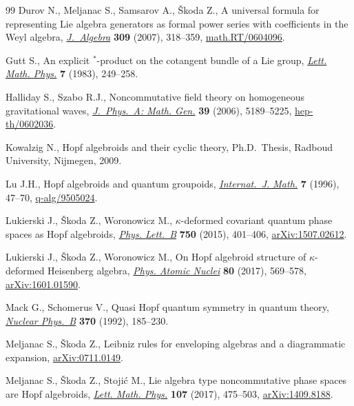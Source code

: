 \documentclass[pdftex]{sigma}
\numberwithin{equation}{section}
\begin{document}
\begin{thebibliography}{99}
Durov N., Meljanac S., Samsarov A., \v{S}koda Z., A universal formula for
 representing {L}ie algebra generators as formal power series with
 coefficients in the {W}eyl algebra, \href{https://doi.org/10.1016/j.jalgebra.2006.08.025}{\textit{J.~Algebra}} \textbf{309} (2007),
 318--359, \href{https://arxiv.org/abs/math.RT/0604096}{math.RT/0604096}.

Gutt S., An explicit {$^{\ast} $}-product on the cotangent bundle of a {L}ie
 group, \href{https://doi.org/10.1007/BF00400441}{\textit{Lett. Math. Phys.}} \textbf{7} (1983), 249--258.

Halliday S., Szabo R.J., Noncommutative field theory on homogeneous
 gravitational waves, \href{https://doi.org/10.1088/0305-4470/39/18/030}{\textit{J.~Phys.~A: Math. Gen.}} \textbf{39} (2006),
 5189--5225, \href{https://arxiv.org/abs/hep-th/0602036}{hep-th/0602036}.

Kowalzig N., Hopf algebroids and their cyclic theory, Ph.D.~Thesis, Radboud
 University, Nijmegen, 2009.

Lu J.H., Hopf algebroids and quantum groupoids, \href{https://doi.org/10.1142/S0129167X96000050}{\textit{Internat.~J. Math.}}
 \textbf{7} (1996), 47--70, \href{https://arxiv.org/abs/q-alg/9505024}{q-alg/9505024}.

Lukierski J., \v{S}koda Z., Woronowicz M., {$\kappa$}-deformed covariant
 quantum phase spaces as {H}opf algebroids, \href{https://doi.org/10.1016/j.physletb.2015.09.042}{\textit{Phys. Lett.~B}}
 \textbf{750} (2015), 401--406, \href{https://arxiv.org/abs/1507.02612}{arXiv:1507.02612}.

Lukierski J., \v{S}koda Z., Woronowicz M., On {H}opf algebroid structure of
 $\kappa$-deformed {H}eisenberg algebra, \href{https://doi.org/10.1134/S1063778817030188}{\textit{Phys. Atomic Nuclei}}
 \textbf{80} (2017), 569--578, \href{https://arxiv.org/abs/1601.01590}{arXiv:1601.01590}.

Mack G., Schomerus V., Quasi {H}opf quantum symmetry in quantum theory,
 \href{https://doi.org/10.1016/0550-3213(92)90350-K}{\textit{Nuclear Phys.~B}} \textbf{370} (1992), 185--230.

Meljanac S., \v{S}koda Z., Leibniz rules for enveloping algebras and a
 diagrammatic expansion, \href{https://arxiv.org/abs/0711.0149}{arXiv:0711.0149}.

Meljanac S., \v{S}koda Z., Stoji\'c M., Lie algebra type noncommutative phase
 spaces are {H}opf algebroids, \href{https://doi.org/10.1007/s11005-016-0908-9}{\textit{Lett. Math. Phys.}} \textbf{107} (2017),
 475--503, \href{https://arxiv.org/abs/1409.8188}{arXiv:1409.8188}.


\end{thebibliography}
\end{document}
